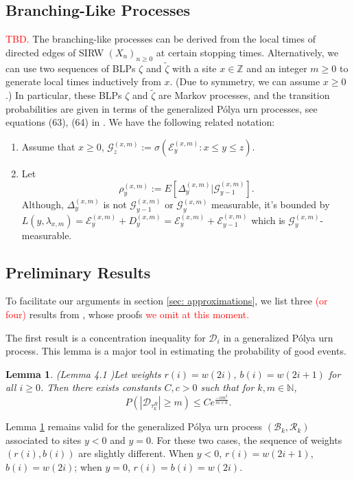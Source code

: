 \documentclass[twoside,12pt,a4paper]{article}
\newtheorem{lemma}{Lemma}[section]
\numberwithin{equation}{section}
\newcommand{\abs}[1]{\left\vert #1 \right\vert}
\newcommand\TBD{\textcolor{red}{TBD.}}
\begin{document}
\subsection{Branching-Like Processes}
\TBD
The branching-like processes can be derived from the local times of directed edges of SIRW $(X_n)_{n\geq 0}$ at certain stopping times. Alternatively, we can use two sequences of BLPs $\zeta$ and $\tilde{\zeta}$ with a site $x\in \mathbb{Z}$ and an integer $m\geq 0$ to generate local times inductively from $x$. (Due to symmetry, we can assume $x\geq 0$.) In particular, these BLPs $\zeta$ and $\tilde{\zeta}$ are Markov processes, and the transition probabilities are given in terms of the generalized P\'{o}lya urn processes, see equations (63), (64) in \cite{KMP22}. We have the following related notation:
\begin{enumerate}
	\item Assume that $x\geq 0$, $\mathcal{G}^{(x,m)}_{z}:= \sigma( \mathcal{E}^{(x,m)}_y: x\leq y\leq z ).$ 
	
	\item Let
	$$
	\rho_y^{(x,m)} := E[ \Delta_y^{(x,m)} \vert \mathcal{G}^{(x,m)}_{y-1}].
	$$ Although, $\Delta_y^{(x,m)}$ is not $\mathcal{G}^{(x,m)}_{y-1}$ or $\mathcal{G}^{(x,m)}_{y}$ measurable, it's bounded by $ L(y, \lambda_{x,m} ) = \mathcal{E}^{(x,m)}_y + D_y^{(x,m)} = \mathcal{E}^{(x,m)}_y + \mathcal{E}^{(x,m)}_{y-1} $ which is $\mathcal{G}^{(x,m)}_{y}$- measurable.
\end{enumerate}

\subsection{Preliminary Results}
To facilitate our arguments in section \ref{sec: approximations}, we list three \textcolor{red}{(or four)} results from \cite{KMP22,T96}, whose proofs \textcolor{red}{we omit at this moment.}

The first result is a concentration inequality for $\mathcal{D}_i$ in a generalized P\'{o}lya urn process. This lemma is a major tool in estimating the probability of good events.
\begin{lemma}(Lemma 4.1 \cite{KMP22})\label{lm: concentration inequality}
	Let weights $r(i) = w(2i)$, $b(i)= w(2i+1) $ for all $i\geq 0$. Then there exists constants $C,c>0$ such that for $k, m \in \mathbb{N}$,
	$$
	P\left(  \abs{ \mathcal{D}_{\tau_k^B}   } \geq m \right) \leq C e^{\frac{-cm^2}{m \vee k}}.
	$$
\end{lemma} 
Lemma \ref{lm: concentration inequality} remains valid for the generalized P\'{o}lya urn process $(\mathcal{B}_{k},\mathcal{R}_{k})$ associated to sites $y<0$ and $y=0$. For these two cases, the sequence of weights $(r(i),b(i))$ are slightly different. When $y<0$, $r(i) = w(2i+1)$, $b(i)= w(2i) $; when $y=0$, $r(i) = b(i)=w(2i)$.
\end{document}
